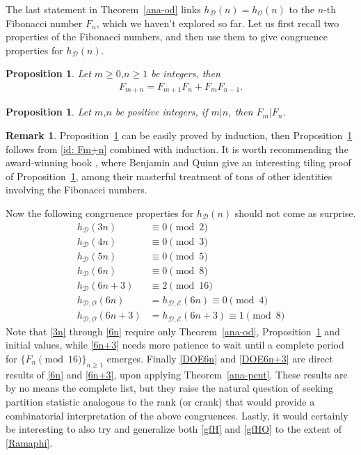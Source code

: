 \documentclass[12pt]{amsart}
\numberwithin{equation}{section}
\theoremstyle{plain}
\newtheorem{proposition}[theorem]{Proposition}
\theoremstyle{definition}
\newtheorem{remark}[theorem]{Remark}
\def\D{\mathcal{D}}
\def\O{\mathcal{O}}
\begin{document}
The last statement in Theorem~\ref{ana-od} links $h_{\D}(n)=h_{\O}(n)$ to the $n$-th Fibonacci number $F_n$, which we haven't explored so far. Let us first recall two properties of the Fibonacci numbers, and then use them to give congruence properties for $h_{\D}(n)$.
\begin{proposition}\label{Fm+n}
Let $m\geq 0$,$n\geq 1$ be integers, then
\begin{align}\label{id: Fm+n}
F_{m+n}=F_{m+1}F_{n}+F_{m}F_{n-1}.
\end{align}
\end{proposition}
\begin{proposition}\label{Fm|Fn}
Let $m$,$n$ be positive integers, if $m|n$, then $F_{m}|F_{n}$.
\end{proposition}
\begin{remark}
Proposition~\ref{Fm+n} can be easily proved by induction, then Proposition~\ref{Fm|Fn} follows from \eqref{id: Fm+n} combined with induction. It is worth recommending the award-winning book \cite{BQ}, where Benjamin and Quinn give an interesting tiling proof of Proposition~\ref{Fm+n}, among their masterful treatment of tons of other identities involving the Fibonacci numbers.
\end{remark}
Now the following congruence properties for $h_{\D}(n)$ should not come as surprise.
\begin{align}
h_{\mathcal{D}}(3n) &\equiv0\pmod{2}\label{3n}\\
h_{\mathcal{D}}(4n) &\equiv0\pmod{3}\\
h_{\mathcal{D}}(5n) &\equiv0\pmod{5}\\
h_{\mathcal{D}}(6n) &\equiv0 \pmod{8}\label{6n}\\
h_{\mathcal{D}}(6n+3) &\equiv2 \pmod{16}\label{6n+3}\\
h_{\mathcal{D, O}}(6n) &=h_{\mathcal{D, E}}(6n)\equiv0 \pmod{4}\label{DOE6n}\\
h_{\mathcal{D, O}}(6n+3) &=h_{\mathcal{D, E}}(6n+3)\equiv1 \pmod{8}\label{DOE6n+3}
\end{align}
Note that \eqref{3n} through \eqref{6n} require only Theorem~\ref{ana-od}, Proposition~\ref{Fm|Fn} and initial values, while \eqref{6n+3} needs more patience to wait until a complete period for $\{F_n \pmod{16}\}_{n\geq 1}$ emerges. Finally \eqref{DOE6n} and \eqref{DOE6n+3} are direct results of \eqref{6n} and \eqref{6n+3}, upon applying Theorem~\ref{ana-pent}. These results are by no means the complete list, but they raise the natural question of seeking partition statistic analogous to the rank (or crank) that would provide a combinatorial interpretation  of the above congruences. Lastly, it would certainly be interesting to also try and generalize both \eqref{gfH} and \eqref{gfHO} to the extent of \eqref{Ramaphi}.
\end{document}
